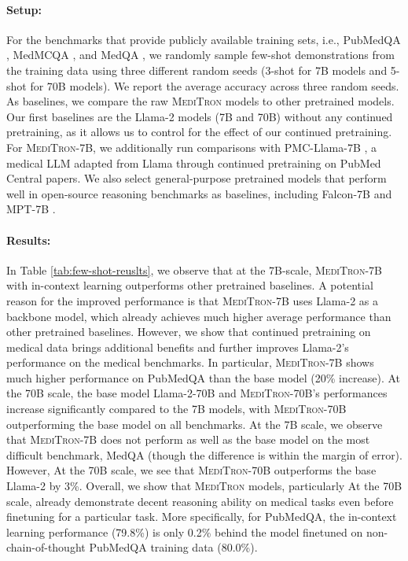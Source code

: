 \documentclass{article}
\newcommand{\llama}{\textnormal{Llama}}
\newcommand{\mtron}{\textsc{MediTron}\xspace}
\newcommand{\mtrona}{\textsc{MediTron-7B}\xspace}
\newcommand{\mtronb}{\textsc{MediTron-70B}\xspace}
\begin{document}
\paragraph{Setup:} 
For the benchmarks that provide publicly available training sets, i.e., PubMedQA \citep{jin-etal-2019-pubmedqa}, MedMCQA \citep{medmcqa}, and MedQA \citep{medqa}, we randomly sample few-shot demonstrations from the training data using three different random seeds (3-shot for 7B models and 5-shot for 70B models). We report the average accuracy across three random seeds. As baselines, we compare the raw \mtron models to other pretrained models. Our first baselines are the \llama-2 models (7B and 70B) without any continued pretraining, as it allows us to control for the effect of our continued pretraining. For \mtrona, we additionally run comparisons with PMC-\llama-7B \citep{wu2023pmcllama}, a medical LLM adapted from \llama{} through continued pretraining on PubMed Central papers. We also select general-purpose pretrained models that perform well in open-source reasoning benchmarks as baselines, including Falcon-7B \citep{falcon40b} and MPT-7B \citep{mpt}. 

\paragraph{Results:} 
In Table \ref{tab:few-shot-reuslts}, we observe that at the 7B-scale, \mtrona with in-context learning outperforms other pretrained baselines. 
A potential reason for the improved performance is that \mtrona uses \llama-2 as a backbone model, which already achieves much higher average performance than other pretrained baselines.
However, we show that continued pretraining on medical data brings additional benefits and further improves \llama-2's performance on the medical benchmarks. 
In particular, \mtrona shows much higher performance on PubMedQA than the base model (20\% increase). 
At the 70B scale, the base model \llama-2-70B and \mtronb's performances increase significantly compared to the 7B models, with \mtronb outperforming the base model on all benchmarks. At the 7B scale, we observe that \mtrona does not perform as well as the base model on the most difficult benchmark, MedQA (though the difference is within the margin of error). However, At the 70B scale, we see that \mtronb outperforms the base \llama-2 by 3\%. Overall, we show that \mtron models, particularly At the 70B scale, already demonstrate decent reasoning ability on medical tasks even before finetuning for a particular task. More specifically, for PubMedQA, the in-context learning performance (79.8\%) is only 0.2\% behind the model finetuned on non-chain-of-thought PubMedQA training data (80.0\%). 
\end{document}

